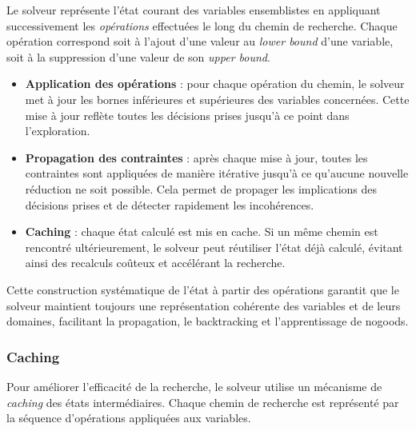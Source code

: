\documentclass{article}
\begin{document}
Le solveur représente l'état courant des variables ensemblistes en appliquant successivement les \emph{opérations} effectuées le long du chemin de recherche. 
Chaque opération correspond soit à l'ajout d'une valeur au \emph{lower bound} d'une variable, soit à la suppression d'une valeur de son \emph{upper bound}.

\begin{itemize}
    \item \textbf{Application des opérations} : pour chaque opération du chemin, le solveur met à jour les bornes inférieures et supérieures des variables concernées. 
    Cette mise à jour reflète toutes les décisions prises jusqu'à ce point dans l'exploration.

    \item \textbf{Propagation des contraintes} : après chaque mise à jour, toutes les contraintes sont appliquées de manière itérative jusqu'à ce qu'aucune nouvelle réduction ne soit possible. 
    Cela permet de propager les implications des décisions prises et de détecter rapidement les incohérences.

    \item \textbf{Caching} : chaque état calculé est mis en cache. 
    Si un même chemin est rencontré ultérieurement, le solveur peut réutiliser l'état déjà calculé, évitant ainsi des recalculs coûteux et accélérant la recherche.
\end{itemize}

Cette construction systématique de l'état à partir des opérations garantit que le solveur maintient toujours une représentation cohérente des variables et de leurs domaines, facilitant la propagation, le backtracking et l'apprentissage de nogoods.

\subsubsection{Caching}

Pour améliorer l'efficacité de la recherche, le solveur utilise un mécanisme de \emph{caching} des états intermédiaires. 
Chaque chemin de recherche est représenté par la séquence d'opérations appliquées aux variables. 
\end{document}
